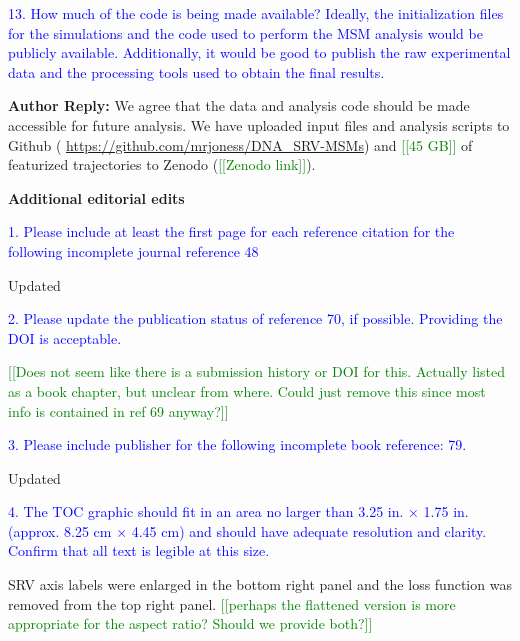 \documentclass[11pt,a4paper]{letter} %
\newcommand*{\noteg}[1]{\textcolor{green}{[[#1]]}}		%
\begin{document}
\textcolor{blue}{13. How much of the code is being made available? Ideally, the initialization files for the simulations and the code used to perform the MSM analysis would be publicly available. Additionally, it would be good to publish the raw experimental data and the processing tools used to obtain the final results.}

\textbf{Author Reply:}   We agree that the data and analysis code should be made accessible for future analysis. We have uploaded input files and analysis scripts to Github ( \url{https://github.com/mrjoness/DNA_SRV-MSMs}) and  \noteg{45 GB} of featurized trajectories to Zenodo (\noteg{Zenodo link}).

\begin{shaded}
\textbf{Additional editorial edits}
\end{shaded}

\textcolor{blue}{1. Please include at least the first page for each reference citation for the following incomplete journal reference 48}

Updated

\textcolor{blue}{2. Please update the publication status of reference 70, if possible.  Providing the DOI is acceptable.}

\noteg{Does not seem like there is a submission history or DOI for this. Actually listed as a book chapter, but unclear from where. Could just remove this since most info is contained in ref 69 anyway?}

\textcolor{blue}{3. Please include publisher for the following incomplete book reference: 79.}

Updated

\textcolor{blue}{4. The TOC graphic should fit in an area no larger than 3.25 in. × 1.75 in. (approx. 8.25 cm × 4.45  cm) and should have adequate resolution and clarity. Confirm that all text is legible at this size.}

SRV axis labels were enlarged in the bottom right panel and the loss function was removed from the top right panel. \noteg{perhaps the flattened version is more appropriate for the aspect ratio? Should we provide both?}



\end{document}
